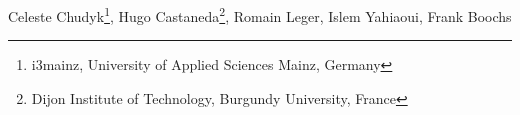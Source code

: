 
Celeste Chudyk\footnote{i3mainz, University of Applied Sciences Mainz, Germany}, Hugo Castaneda\footnote{Dijon Institute of Technology, Burgundy University, France}, Romain Leger, Islem Yahiaoui, Frank Boochs